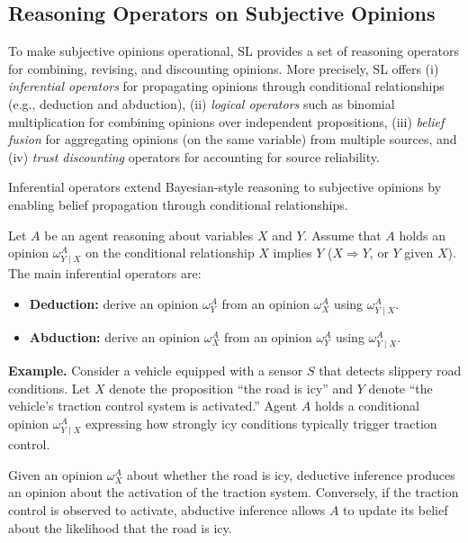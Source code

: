 \subsection{Reasoning Operators on Subjective Opinions}
To make subjective opinions operational, \ac{SL} provides a set of reasoning operators for combining, revising, and discounting opinions. More precisely, \ac{SL} offers (i) \emph{inferential operators} for propagating opinions through conditional relationships (e.g., deduction and abduction), (ii) \emph{logical operators} such as binomial multiplication for combining opinions over independent propositions, (iii) \emph{belief fusion} for aggregating opinions (on the same variable) from multiple sources, and (iv) \emph{trust discounting} operators for accounting for source reliability.
\begin{definition}
\label{def:inferential_ops}
Inferential operators extend Bayesian-style reasoning to subjective opinions 
by enabling belief propagation through conditional relationships.

Let $A$ be an agent reasoning about variables $X$ and $Y$. 
Assume that $A$ holds an opinion $\omega^A_{Y \mid X}$ on the conditional relationship $X$ implies $Y$ ($X \Rightarrow Y$, or $Y$ given $X$). 
The main inferential operators are:
\begin{itemize}
    \item \textbf{Deduction:} derive an opinion $\omega^A_Y$ 
    from an opinion $\omega^A_X$ using $\omega^A_{Y \mid X}$.

    \item \textbf{Abduction:} derive an opinion $\omega^A_X$ 
    from an opinion $\omega^A_Y$ using $\omega^A_{Y \mid X}$.
\end{itemize}

\textbf{Example.} 
Consider a vehicle equipped with a sensor $S$ that detects slippery road conditions.
Let $X$ denote the proposition “the road is icy” and $Y$ denote 
“the vehicle’s traction control system is activated.” 
Agent $A$ holds a conditional opinion $\omega^A_{Y \mid X}$ expressing 
how strongly icy conditions typically trigger traction control.

Given an opinion $\omega^A_X$ about whether the road is icy, 
deductive inference produces an opinion about the activation of the traction system.
Conversely, if the traction control is observed to activate, 
abductive inference allows $A$ to update its belief about the likelihood 
that the road is icy.
\end{definition}

